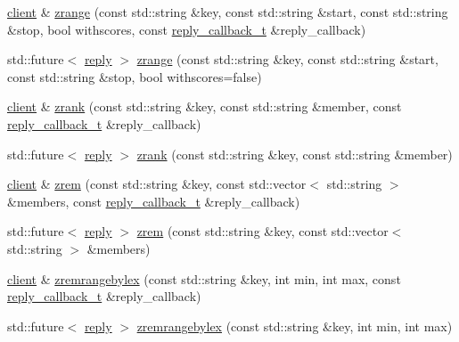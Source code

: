 \begin{DoxyCompactItemize}
\item 
\hyperlink{classcpp__redis_1_1client}{client} \& \hyperlink{classcpp__redis_1_1client_a3768026508c4c2e28c600bf7be54b4a1}{zrange} (const std\+::string \&key, const std\+::string \&start, const std\+::string \&stop, bool withscores, const \hyperlink{classcpp__redis_1_1client_a061a1140d36d2eaeda82b09a0bb3f9f2}{reply\+\_\+callback\+\_\+t} \&reply\+\_\+callback)
\item 
std\+::future$<$ \hyperlink{classcpp__redis_1_1reply}{reply} $>$ \hyperlink{classcpp__redis_1_1client_aaaaf7f2d11f02bc7709be1b2a654894d}{zrange} (const std\+::string \&key, const std\+::string \&start, const std\+::string \&stop, bool withscores=false)
\item 
\hyperlink{classcpp__redis_1_1client}{client} \& \hyperlink{classcpp__redis_1_1client_a5563d5240de4bbdbf6ed5dd8cc92a67a}{zrank} (const std\+::string \&key, const std\+::string \&member, const \hyperlink{classcpp__redis_1_1client_a061a1140d36d2eaeda82b09a0bb3f9f2}{reply\+\_\+callback\+\_\+t} \&reply\+\_\+callback)
\item 
std\+::future$<$ \hyperlink{classcpp__redis_1_1reply}{reply} $>$ \hyperlink{classcpp__redis_1_1client_acf680674a3944a3baaa36f888250610e}{zrank} (const std\+::string \&key, const std\+::string \&member)
\item 
\hyperlink{classcpp__redis_1_1client}{client} \& \hyperlink{classcpp__redis_1_1client_ae33a0ea1127a5da870db4354fad2bd10}{zrem} (const std\+::string \&key, const std\+::vector$<$ std\+::string $>$ \&members, const \hyperlink{classcpp__redis_1_1client_a061a1140d36d2eaeda82b09a0bb3f9f2}{reply\+\_\+callback\+\_\+t} \&reply\+\_\+callback)
\item 
std\+::future$<$ \hyperlink{classcpp__redis_1_1reply}{reply} $>$ \hyperlink{classcpp__redis_1_1client_aff2e5ec7005f76869fad79c4e8bd68c8}{zrem} (const std\+::string \&key, const std\+::vector$<$ std\+::string $>$ \&members)
\item 
\hyperlink{classcpp__redis_1_1client}{client} \& \hyperlink{classcpp__redis_1_1client_aff3c4f11d504ba64a98b6bce9bf319a0}{zremrangebylex} (const std\+::string \&key, int min, int max, const \hyperlink{classcpp__redis_1_1client_a061a1140d36d2eaeda82b09a0bb3f9f2}{reply\+\_\+callback\+\_\+t} \&reply\+\_\+callback)
\item 
std\+::future$<$ \hyperlink{classcpp__redis_1_1reply}{reply} $>$ \hyperlink{classcpp__redis_1_1client_a9277ebc759190ce6f085a60a98ad3a7c}{zremrangebylex} (const std\+::string \&key, int min, int max)
\item 

\end{DoxyCompactItemize}
